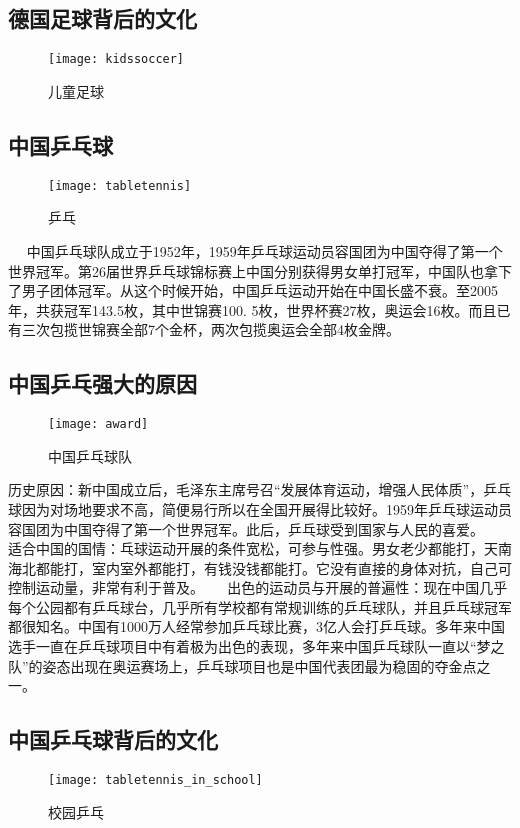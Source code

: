 \subsection{德国足球背后的文化}
\begin{figure}[htb]
    \centering
    \texttt{[image: kidssoccer]}
    \caption{儿童足球}
\end{figure}

\subsection{中国乒乓球}
\begin{figure}[htb]
    \centering
    \texttt{[image: tabletennis]}
    \caption{乒乓}
\end{figure}

    中国乒乓球队成立于1952年，1959年乒乓球运动员容国团为中国夺得了第一个世界冠军。第26届世界乒乓球锦标赛上中国分别获得男女单打冠军，中国队也拿下了男子团体冠军。从这个时候开始，中国乒乓运动开始在中国长盛不衰。至2005年，共获冠军143.5枚，其中世锦赛100. 5枚，世界杯赛27枚，奥运会16枚。而且已有三次包揽世锦赛全部7个金杯，两次包揽奥运会全部4枚金牌。

\subsection{中国乒乓强大的原因}
\begin{figure}[htb]
    \centering
    \texttt{[image: award]}
    \caption{中国乒乓球队}
\end{figure}

    历史原因：新中国成立后，毛泽东主席号召“发展体育运动，增强人民体质”，乒乓球因为对场地要求不高，简便易行所以在全国开展得比较好。1959年乒乓球运动员容国团为中国夺得了第一个世界冠军。此后，乒乓球受到国家与人民的喜爱。 
    适合中国的国情：乓球运动开展的条件宽松，可参与性强。男女老少都能打，天南海北都能打，室内室外都能打，有钱没钱都能打。它没有直接的身体对抗，自己可控制运动量，非常有利于普及。 
    出色的运动员与开展的普遍性：现在中国几乎每个公园都有乒乓球台，几乎所有学校都有常规训练的乒乓球队，并且乒乓球冠军都很知名。中国有1000万人经常参加乒乓球比赛，3亿人会打乒乓球。多年来中国选手一直在乒乓球项目中有着极为出色的表现，多年来中国乒乓球队一直以“梦之队”的姿态出现在奥运赛场上，乒乓球项目也是中国代表团最为稳固的夺金点之一。

\subsection{中国乒乓球背后的文化}
\begin{figure}[htb]
    \centering
    \texttt{[image: tabletennis\_in\_school]}
    \caption{校园乒乓}
\end{figure}

